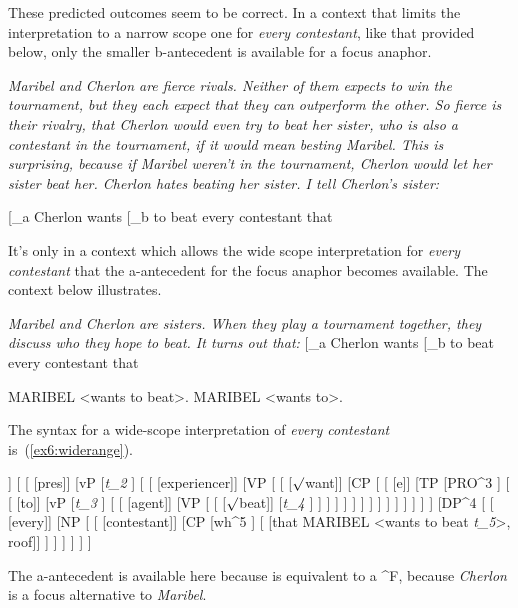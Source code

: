 These predicted outcomes seem to be correct. In a context that limits the interpretation to a narrow scope one for \textit{every contestant}, like that provided below, only the smaller b-antecedent is available for a focus anaphor.
\begin{exe}
\raggedright
\sn \textit{Maribel and Cherlon are fierce rivals. Neither of them expects to win the tournament, but they each expect that they can outperform the other. So fierce is their rivalry, that Cherlon would even try to beat her sister, who is also a contestant in the tournament, if it would mean besting Maribel. This is surprising, because if Maribel weren't in the tournament, Cherlon would let her sister beat her. Cherlon hates beating her sister. I tell Cherlon's sister:}

	\ex \label{ex6:acdrange} {}[_a Cherlon wants [_b to beat every contestant that
	\begin{xlist}
	\end{xlist}
\end{exe}
It's only in a context which allows the wide scope interpretation for \textit{every contestant}  that the a-antecedent for the focus anaphor becomes available. The context below illustrates.
\begin{exe}
\raggedright
	\sn \textit{Maribel and Cherlon are sisters. When they play a tournament together, they discuss who they hope to beat. It turns out that:}
	\ex \label{ex6:acdrange2} {}[_a Cherlon wants [_b to beat every contestant that
	\begin{xlist}
		\ex MARIBEL <wants to beat>.
		\ex MARIBEL <wants to>.
	\end{xlist}
\end{exe}
The syntax for a wide-scope interpretation of \textit{every contestant} is~(\ref{ex6:widerange}).
\begin{exe}
\raggedright
	\ex \label{ex6:widerange}
	\small
	\begin{forest}
	[TP
		[\fbox{TP}
			[DP^2 [Cherlon, roof]]
			[
				[ [pres]]
				[vP
					[\textit{t_2} ]
					[
						[ [experiencer]]
						[VP [
							[ [$\surd$want]]
							[CP [
								[ [e]]
								[TP
									[PRO^3 ]
									[
										[ [to]]
										[vP
											[\textit{t_3} ]
											[
												[ [agent]]
												[VP [
													[ [$\surd$beat]]
													[\textit{t_4} ]
												] ]
											 ]
										 ]
									 ]
								 ]
							] ]
						] ]
					 ]
				 ]
			 ]
		 ]
		[DP^4 [
			[ [every]]
			[NP [
				[ [contestant]]
				[CP
					[wh^5 ]
					[ [that MARIBEL <wants to beat \textit{t_5}>, roof]]
				 ]
			] ]
		] ]
	]
	\end{forest}
\end{exe}
The a-antecedent is available here because  is equivalent to a ^F, because \textit{Cherlon} is a focus alternative to \textit{Maribel}.

